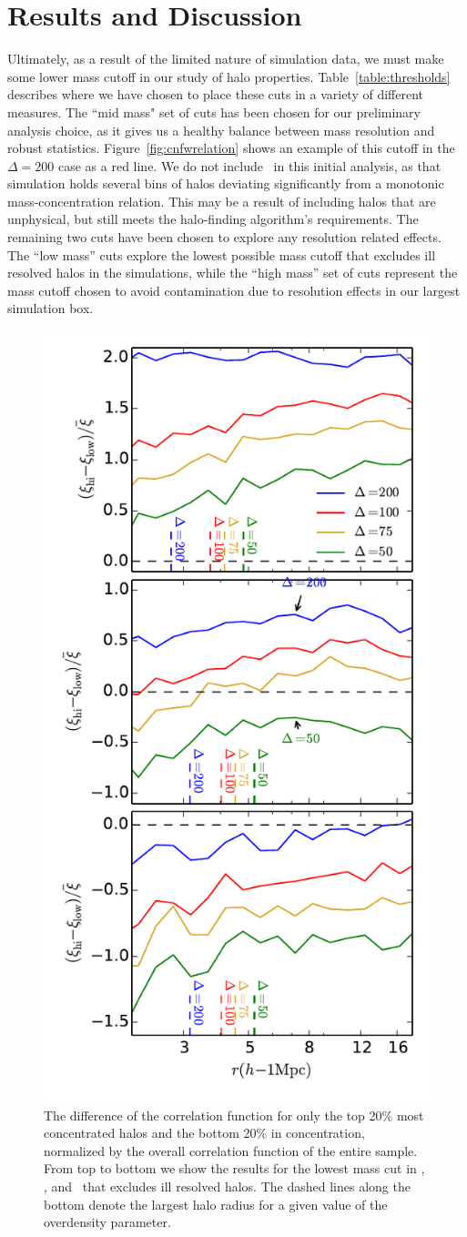 \documentclass[usenatbib,usegraphicx,letterpaper]{mn2e}
\begin{document}
\section[]{Results and Discussion}
\label{section:results}

Ultimately, as a result of the limited nature of simulation data, we must make some lower mass cutoff in our study of halo properties. Table~\ref{table:thresholds} describes where we have chosen to place these cuts in a variety of different measures. The ``mid mass" set of cuts has been chosen for our preliminary analysis choice, as it gives us a healthy balance between mass resolution and robust statistics. Figure~\ref{fig:cnfwrelation} shows an example of this cutoff in the $\Delta = 200$ case as a red line. We do not include \simC \ in this initial analysis, as that simulation holds several bins of halos deviating significantly from a monotonic mass-concentration relation. This may be a result of including halos that are unphysical, but still meets the halo-finding algorithm's requirements.  The remaining two cuts have been chosen to explore any resolution related effects. The ``low mass'' cuts explore the lowest possible mass cutoff that excludes ill resolved halos in the \citet{diemer15} simulations, while the ``high mass'' set of cuts represent the mass cutoff chosen to avoid contamination due to resolution effects in our largest simulation box.

\begin{figure}
	\centering
	\includegraphics[width=.4\textwidth]{all_cfhilow_z00_cutcomp.pdf}
	\caption{The difference of the correlation function for only the top 20\% most concentrated halos and the bottom 20\% in concentration, normalized by the overall correlation function of the entire sample. From top to bottom we show the results for the lowest mass cut in \simA, \simB, and \simC \ that excludes ill resolved halos. The dashed lines along the bottom denote the largest halo radius for a given value of the overdensity parameter.}
	\label{fig:cc_cfcompare}
\end{figure}
\end{document}
